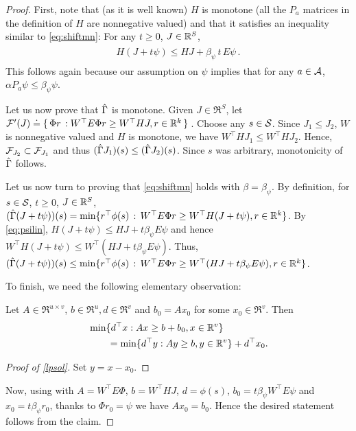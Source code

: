 \documentclass[twocolumn]{IEEEtran}
\begin{document}
\begin{proof}
First, note that (as it is well known) $H$ is monotone (all
the $P_a$ matrices in the definition of $H$ are nonnegative valued)
and that it satisfies an inequality similar to \eqref{eq:shiftmn}: For any $t\ge 0$, $J\in \R^S$,
\begin{align}\label{eq:psilin}
\begin{split}
H(J+ t \psi ) \le HJ + \beta_{\psi}\,t\,  E  \psi\,.
\end{split}
\end{align}
This follows again because our assumption on $\psi$ implies that for any $a\in \A$, $\alpha P_a \psi \le \beta_{\psi} \psi$.

Let us now prove that $\hg$ is monotone.
Given $J\in \Re^S$, let $\F'(J)\eqdef\{\,\Phi r\,: W^\top E \Phi r\geq W^\top HJ, r\in \Re^k\,\}\,$.
Choose any $s\in \S$. Since $J_1\leq J_2$, $W$ is nonnegative valued and $H$ is monotone,
we have $W^\top H J_1\leq W^\top H J_2$.
Hence, $\F_{J_2} \subset \F_{J_1}$
and thus $(\hg J_1)(s) \le (\hg J_2)(s)$.  Since $s$ was arbitrary, monotonicity of $\hg$ follows.

Let us now turn to proving that \eqref{eq:shiftmn} holds with $\beta =\beta_\psi$.
By definition, for $s\in \S$, $t\ge 0$, $J\in \R^S$,
$(\hg (J+t\psi) )(s) = \min\{ r^\top \phi(s) \,:\, W^\top E\Phi r \ge W^\top H(J+t\psi), r\in \Re^k \}$.
By \eqref{eq:psilin},
$H(J+t\psi) \le HJ + t \beta_\psi E \psi$
and hence $W^\top H(J+t\psi) \le W^\top (HJ + t \beta_\psi E \psi)$.
Thus,
$(\hg (J+t\psi) )(s) \le  \min\{ r^\top \phi(s)\,:\, W^\top E\Phi r \ge W^\top (HJ+t\beta_\psi E \psi), r\in \Re^k \}$.

To finish, we need the following elementary observation:
\begin{claim}\label{lpsol}
Let $A\in \Re^{u\times v}$, $b\in \Re^u,d\in \Re^v$ and $b_0=Ax_0$ for
some $x_0 \in \Re^v$. %
Then
\begin{align*}
\begin{split}
\MoveEqLeft \min\{d^\top x:Ax\geq b+b_0, x\in \Re^v\} \nn\\
&=\min\{d^\top y:Ay \geq b, y \in \Re^v \}+d^\top x_0.
\end{split}
\end{align*}
\end{claim}
\begin{proof}[Proof of \cref{lpsol}]
Set $y = x-x_0$.
\end{proof}
Now, using  with $A=W^\top E \Phi$, $b=W^\top HJ$, $d=\phi(s)$, $b_0=t\beta_\psi W^\top E \psi$
and $x_0=t \beta_\psi r_0$,  thanks to $\Phi r_0 = \psi$ we have $A x_0 = b_0$.
Hence the desired statement follows from the claim.
\end{proof}
\end{document}
